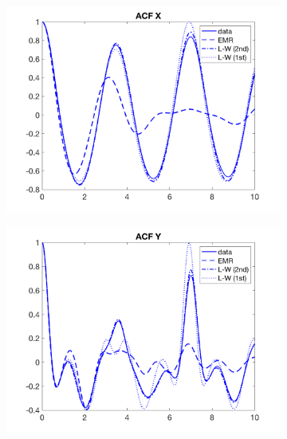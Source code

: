 \documentclass[12pt]{article}
\begin{document}
\begin{figure}[H]
	\centering
	\begin{subfigure}[b]{0.3\textwidth}
		\centering
		\includegraphics[width=\textwidth]{plots/l84l63/acfx025z.png}
	\end{subfigure}
	\begin{subfigure}[b]{0.3\textwidth}
		\centering
		\includegraphics[width=\textwidth]{plots/l84l63/acfy025z.png}
	\end{subfigure}
	\begin{subfigure}[b]{0.3\textwidth}
		\centering

\end{subfigure}
\end{figure}
\end{document}
